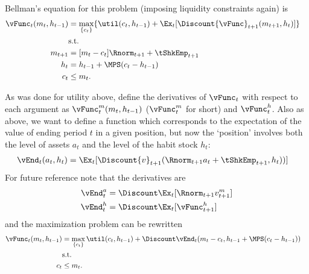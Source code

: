 \documentclass[titlepage]{\econtex}
\begin{document}
{  Bellman's equation for this problem (imposing liquidity constraints again) is
  \begin{equation}\begin{gathered}\begin{aligned}
    {\vFunc}_{t}({m}_{t},h_{t-1})  & = \max_{\{{c}_{t}\}}  \{\util({c}_{t},h_{t-1}) +
                                        \Ex_{t}[\Discount  {\vFunc}_{t+1}({m}_{t+1},h_{t}) ]\}
    \\ & \text{s.t.} & \nonumber \\
    {m}_{t+1}  & = [{m}_{t}-{c}_{t}]\Rnorm_{t+1} + \tShkEmp_{t+1}\\
    h_{t}  & = h_{t-1} + \MPS ({c}_{t} - h_{t-1} ) \\
    {c}_{t} & \leq  {m}_{t} .
  \end{aligned}\end{gathered}\end{equation}

  As was done for utility above, define the derivatives of ${\vFunc}_{t}$ with
  respect to each argument as ${\vFunc}_{t}^{m}({m}_{t},h_{t-1})$ (${\vFunc}_{t}^{m}$
  for short) and ${\vFunc}_{t}^{h}$.  Also as above, we want to
  define a function which corresponds to the expectation of the value of
  ending period $t$ in a given position, but now the `position'
  involves both the level of assets ${a}_{t}$ and the level of the habit
  stock $h_{t}$:
  \begin{equation}\begin{gathered}\begin{aligned}
    \vEnd_{t}({a}_{t},h_{t})  & = \Ex_{t}[\Discount {v}_{t+1}(\Rnorm_{t+1} {a}_{t}+{\tShkEmp}_{t+1},h_{t}))]
  \end{aligned}\end{gathered}\end{equation}
  For future reference note that the derivatives are
  \begin{equation}\begin{gathered}\begin{aligned}
    \vEnd_{t}^{{a}}  & = \Discount \Ex_{t} [\Rnorm_{t+1} {v}_{t+1}^{m}] \label{eq:vEndsdefn} \\
    \vEnd_{t}^{h}  & = \Discount \Ex_{t} [{\vFunc}_{t+1}^{h}] \label{eq:vEndhdefn}
  \end{aligned}\end{gathered}\end{equation}
  and the maximization problem can be rewritten
  \begin{equation}\begin{gathered}\begin{aligned}
    {\vFunc}_{t}({m}_{t},h_{t-1}) 
& =                                         \max_{\{{c}_{t}\}} %
                                        \util({c}_{t},h_{t-1})  +  \Discount
                                        \vEnd_{t}({m}_{t}-{c}_{t},h_{t-1}+\MPS({c}_{t}-h_{t-1}))
    \\        & \text{s.t.} & \nonumber
    \\  {c}_{t} & \leq  {m}_{t}.
  \end{aligned}\end{gathered}\end{equation}

}
\end{document}
